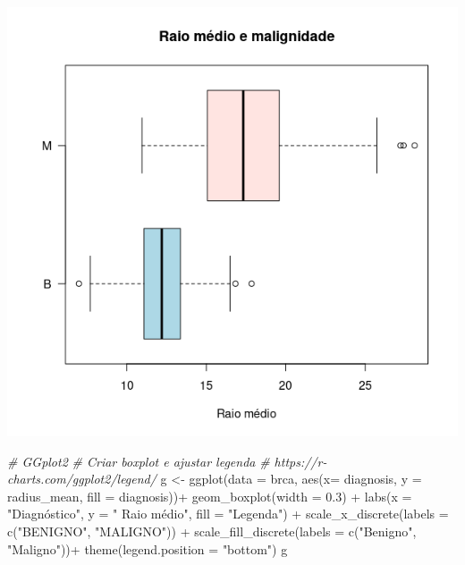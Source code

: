 \documentclass[
]{book}
\newenvironment{Shaded}{\begin{snugshade}}{\end{snugshade}}
\newcommand{\AttributeTok}[1]{\textcolor[rgb]{0.77,0.63,0.00}{#1}}
\newcommand{\CommentTok}[1]{\textcolor[rgb]{0.56,0.35,0.01}{\textit{#1}}}
\newcommand{\FloatTok}[1]{\textcolor[rgb]{0.00,0.00,0.81}{#1}}
\newcommand{\FunctionTok}[1]{\textcolor[rgb]{0.00,0.00,0.00}{#1}}
\newcommand{\NormalTok}[1]{#1}
\newcommand{\OtherTok}[1]{\textcolor[rgb]{0.56,0.35,0.01}{#1}}
\newcommand{\SpecialCharTok}[1]{\textcolor[rgb]{0.00,0.00,0.00}{#1}}
\newcommand{\StringTok}[1]{\textcolor[rgb]{0.31,0.60,0.02}{#1}}
\begin{document}
\includegraphics{figure/g27.png}

\begin{Shaded}
\begin{Highlighting}[]
\CommentTok{\# GGplot2}
\CommentTok{\# Criar boxplot e ajustar legenda}
\CommentTok{\# https://r{-}charts.com/ggplot2/legend/}
\NormalTok{g }\OtherTok{\textless{}{-}} \FunctionTok{ggplot}\NormalTok{(}\AttributeTok{data =}\NormalTok{ brca,}
            \FunctionTok{aes}\NormalTok{(}\AttributeTok{x=}\NormalTok{ diagnosis, }\AttributeTok{y =}\NormalTok{ radius\_mean, }\AttributeTok{fill =}\NormalTok{ diagnosis))}\SpecialCharTok{+}
  \FunctionTok{geom\_boxplot}\NormalTok{(}\AttributeTok{width =} \FloatTok{0.3}\NormalTok{) }\SpecialCharTok{+}
  \FunctionTok{labs}\NormalTok{(}\AttributeTok{x =} \StringTok{"Diagnóstico"}\NormalTok{,}
       \AttributeTok{y =} \StringTok{" Raio médio"}\NormalTok{,}
       \AttributeTok{fill =} \StringTok{"Legenda"}\NormalTok{) }\SpecialCharTok{+}
  \FunctionTok{scale\_x\_discrete}\NormalTok{(}\AttributeTok{labels =} \FunctionTok{c}\NormalTok{(}\StringTok{"BENIGNO"}\NormalTok{, }\StringTok{"MALIGNO"}\NormalTok{)) }\SpecialCharTok{+}
  \FunctionTok{scale\_fill\_discrete}\NormalTok{(}\AttributeTok{labels =} \FunctionTok{c}\NormalTok{(}\StringTok{"Benigno"}\NormalTok{, }\StringTok{"Maligno"}\NormalTok{))}\SpecialCharTok{+}
  \FunctionTok{theme}\NormalTok{(}\AttributeTok{legend.position =} \StringTok{"bottom"}\NormalTok{)}
\NormalTok{g}
\end{Highlighting}
\end{Shaded}
\end{document}
